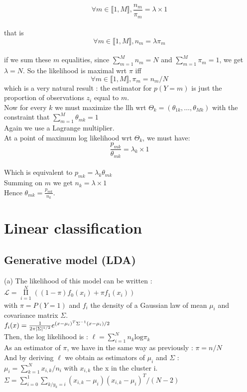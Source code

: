 \documentclass[11pt,a4paper]{article}
\begin{document}
 $$\forall m \in \llbracket 1, M \rrbracket, \frac{n_m}{\pi_m} = \lambda \times 1$$
\\that is 
$$\forall m \in \llbracket 1, M \rrbracket, n_m = \lambda \pi_m$$
\\if we sum these $m$ equalities, since $\sum\limits_{m=1}^{M} n_m = N$ and $\sum\limits_{m=1}^{M} \pi_m = 1$, we get $\lambda = N$.
So the likelihood is maximal wrt $\pi$ iff $$\forall m \in \llbracket 1, M \rrbracket,  \pi_m = n_m/N$$
which is a very natural result : the estimator for $p(Y=m)$ is just the proportion of observations $z_i$ equal to $m$.
%
\\[5mm]Now for every $k$ we must maximize the llh wrt $\Theta_k = (\theta_{1k}, \ldots, \theta_{Mk})$ with the constraint that $ \sum\limits_{m=1}^{M}  \theta_{mk} = 1$
\\Again we use a Lagrange multiplier.
\\At a point of maximum log likelihood wrt $\Theta_k$, we must have:
%
$$\frac{p_{mk}}{ \theta_{mk}} = \lambda_k \times 1$$
\\Which is equivalent to $p_{mk} = \lambda_k \theta_{mk}$
\\Summing on $m$ we get $n_k = \lambda \times 1$
\\Hence $\theta_{mk} = \frac{p_{mk}}{n_k}$.

\section{Linear classification}

\subsection{Generative model (LDA)}

(a) The likelihood of this model can be written : $\mathcal{L} = \mathop{\Pi}\limits_{i=1}^N ((1-\pi) f_0(x_i) + \pi f_1(x_i))$
\\with $\pi = P(Y = 1)$ and $f_i$ the density of a Gaussian law of mean $\mu_i$ and covariance matrix $\Sigma$.
\\ $f_i(x) = {1 \over 2 \pi |\Sigma|^{1/2}} e^{(x-\mu_i)^{T} \Sigma^{-1} (x-\mu_i) / 2}$
\\Then, the log likelihood is : $\ell =  \sum\limits_{i=1}^N n_k \mathrm{log} \pi_k$
\\As an estimator of $\pi$, we have in the same way as previously : $\pi = n/N$ 
\\And by deriving $\ell$ we obtain as estimators of $\mu_i$ and $\Sigma$ :
\\$\mu_i = \sum\limits_{k=1}^N x_{i,k}/n_i$ with $x_{i,k}$ the x in the cluster i.
\\$\Sigma = \sum\limits_{i=0}^1 \sum\limits_{k/ y_k = i} (x_{i,k} - \mu_i) (x_{i,k} - \mu_i)^{T} / (N-2)$ %
\end{document}
